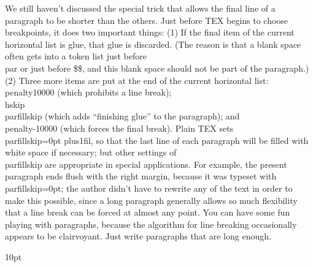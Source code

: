\leftskip=-1pt
\rightskip=1pt
We still haven’t discussed the special trick that allows the final line of a
paragraph to be shorter than the others.
Just before TEX begins to choose
breakpoints, it does two important things: (1) If the final item of the current horizontal
list is glue, that glue is discarded. 
(The reason is that a blank space often gets into a
token list just before \\par or just before \$\$, 
and this blank space should not be part
of the paragraph.) 
(2) Three more items are put at the end of the current horizontal
list: \\{penalty10000} (which prohibits a line break); \\{hskip\\parfillskip} (which adds
“finishing glue” to the paragraph);
and \\penalty-10000 (which forces the final break).
Plain TEX sets \\parfillskip=0pt plus1fil,
so that the last line of each paragraph will
be filled with white space if necessary;
but other settings of \\parfillskip are appropriate in special applications.
For example, the present paragraph ends flush with the
right margin, because it was typeset with \\parfillskip=0pt; the author didn’t have to
rewrite any of the text in order to make this possible, since a long paragraph generally
allows so much flexibility that a line break can be forced at almost any point. You
can have some fun playing with paragraphs, because the algorithm for line breaking
occasionally appears to be clairvoyant. Just write paragraphs that are long enough.

10pt

